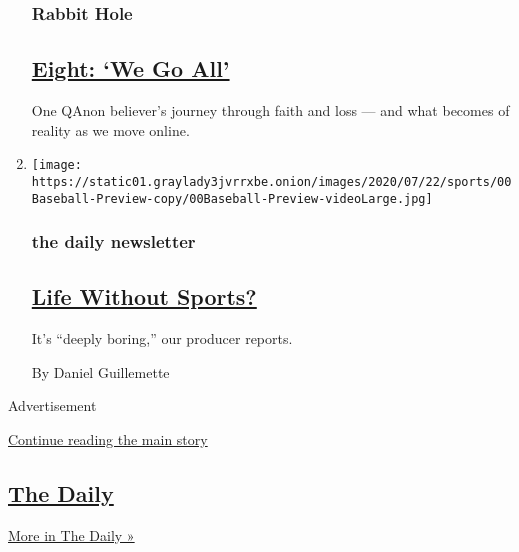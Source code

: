 \begin{enumerate}
  \hypertarget{rabbit-hole}{%
  \subsubsection{Rabbit Hole}\label{rabbit-hole}}

  \hypertarget{eight-we-go-all}{%
  \subsection{\texorpdfstring{\href{/2020/06/04/podcasts/rabbit-hole-qanon-youtube-tiktok-virus.html}{Eight:
  `We Go All'}}{Eight: `We Go All'}}\label{eight-we-go-all}}

  One QAnon believer's journey through faith and loss --- and what
  becomes of reality as we move online.
\item
  \texttt{[image: https://static01.graylady3jvrrxbe.onion/images/2020/07/22/sports/00Baseball-Preview-copy/00Baseball-Preview-videoLarge.jpg]}

  \hypertarget{the-daily-newsletter}{%
  \subsubsection{the daily newsletter}\label{the-daily-newsletter}}

  \hypertarget{life-without-sports}{%
  \subsection{\texorpdfstring{\href{/2020/07/31/podcasts/daily-newsletter-baseball-season-serial.html}{Life
  Without Sports?}}{Life Without Sports?}}\label{life-without-sports}}

  It's ``deeply boring,'' our producer reports.

  By Daniel Guillemette
\end{enumerate}

Advertisement

\protect\hyperlink{after-mid1}{Continue reading the main story}

\hypertarget{the-daily-1}{%
\subsection{\texorpdfstring{\href{/column/the-daily}{The
Daily}}{The Daily}}\label{the-daily-1}}

\href{/column/the-daily}{More in The Daily »}

